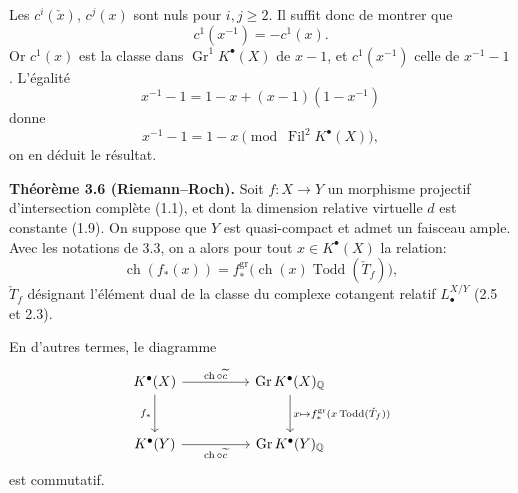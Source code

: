 \documentclass[11pt]{article}
\newcommand{\Gr}{\operatorname{Gr}}
\newcommand{\Fil}{\operatorname{Fil}}
\newcommand{\ch}{\operatorname{ch}}
\newcommand{\Todd}{\operatorname{Todd}}
\providecommand{\ch}{\operatorname{ch}}
\providecommand{\Todd}{\operatorname{Todd}}
\providecommand{\Gr}{\operatorname{Gr}}
\providecommand{\Gr}{\operatorname{G}}
\begin{document}
Les $c^i(\check x)$, $c^j(x)$ sont nuls pour $i,j\geq2$. Il suffit donc de montrer que
\[
c^1(x^{-1})=-c^1(x).
\]
Or $c^1(x)$ est la classe dans $\Gr^1K^{\bullet}(X)$ de $x-1$, et $c^1(x^{-1})$ celle de $x^{-1}-1$. L'égalité
\[
x^{-1}-1=1-x+(x-1)(1-x^{-1})
\]
donne
\[
x^{-1}-1=1-x\pmod{\Fil^2K^{\bullet}(X)},
\]
on en déduit le résultat.

\textbf{Théorème 3.6 (Riemann--Roch).} Soit $f:X\to Y$ un morphisme projectif d'intersection complète (1.1), et dont la dimension relative virtuelle $d$ est constante (1.9). On suppose que $Y$ est quasi-compact et admet un faisceau ample. Avec les notations de 3.3, on a alors pour tout $x\in K^{\bullet}(X)$ la relation:
\[
\ch(f_*(x))=f^{\mathrm{gr}}_*\bigl(\ch(x)\Todd(\check T_f)\bigr),
\]
$\check T_f$ désignant l'élément dual de la classe du complexe cotangent relatif $L^{X/Y}_\bullet$ (2.5 et 2.3).

En d'autres termes, le diagramme
\[
\begin{tikzcd}[column sep=huge,row sep=large]
K^{\bullet}(X) \arrow[r,"\ch\circ\widetilde c"] \arrow[d,"f_*"'] & \Gr K^{\bullet}(X)_{\mathbb Q} \arrow[d,"x\mapsto f^{\mathrm{gr}}_*(x\Todd(\check T_f))"]\\
K^{\bullet}(Y) \arrow[r,"\ch\circ\widetilde c"'] & \Gr K^{\bullet}(Y)_{\mathbb Q}
\end{tikzcd}
\]
est commutatif.
\end{document}
